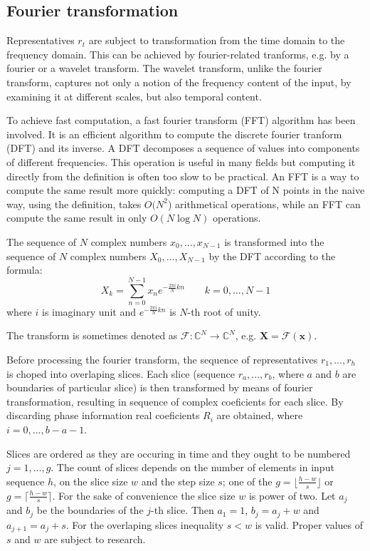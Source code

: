 \documentclass[a4paper,journal]{IEEEtran}
\begin{document}

\subsection{Fourier transformation}
Representatives $r_t$ are subject to transformation from the time domain to the
frequency domain.
This can be achieved by fourier-related
tranforms, e.g. by a fourier or a wavelet transform.
The wavelet transform, unlike the fourier transform, captures
not only a notion of the frequency content of the input, by
examining it at different scales, but also temporal content.

To achieve fast computation, a fast fourier transform (FFT) algorithm 
has been involved.
It is an efficient algorithm to compute the discrete fourier tranform (DFT) and
its inverse.
A DFT decomposes a sequence of values into components of
different frequencies. 
This operation is useful in many fields but computing it directly from the
definition is often too slow to be practical.
An FFT is a way to compute the same result more quickly: 
computing a DFT of N points in the naive way, using the definition, takes
$O(N^2$) arithmetical operations, 
while an FFT can compute the same result in only $ O(N \log N)$ operations.

The sequence of $N$ complex numbers $x_0, ..., x_{N−1}$ is transformed into the
sequence of $N$ complex numbers $X_0, ..., X_{N−1}$ by the DFT according to the
formula:
\begin{equation}
X_k = \sum_{n=0}^{N-1} x_n e^{-\frac{2 \pi i}{N} k n} \quad \quad k = 0, \dots, N-1
\end{equation}
where $i$ is imaginary unit and $e^{-\frac{2 \pi i}{N} k n}$ is $N$-th root of
unity. 

The transform is sometimes denoted as 
$\mathcal{F}\colon\mathbb{C}^N \to \mathbb{C}^N$, e.g.
$\mathbf{X} = \mathcal{F} \left ( \mathbf{x} \right )$.

Before processing the fourier transform, the sequence of representatives 
$r_1, ...,r_h$ is choped into overlaping slices.
Each slice (sequence $r_a, ..., r_b$, where $a$ and $b$ are boundaries
of particular slice) is then transformed by means of fourier transformation,
resulting in sequence of complex coeficients for each slice.
By discarding phase information real coeficients ${R}_i$ are obtained,
where $i = 0, ..., b-a-1$.

Slices are ordered as they are occuring in time and they ought to be numbered
$j = 1,..., g $. The count of slices  depends on the number of elements 
in input sequence $h$, on the slice size $w$ and the step size $s$; one of the
$g=\lfloor\frac{h-w}{s} \rfloor$ or $g=\lceil\frac{h-w}{s} \rceil$.
For the sake of convenience the slice size $w$ is power of two.
Let $a_j$ and $b_j$ be the boundaries of the $j$-th slice. Then
$a_1 = 1$, $b_j = a_j + w$ and $a_{j+1} = a_j + s$.
For the overlaping slices inequality $s < w$ is valid.
Proper values of $s$ and $w$ are subject to research.
\end{document}
